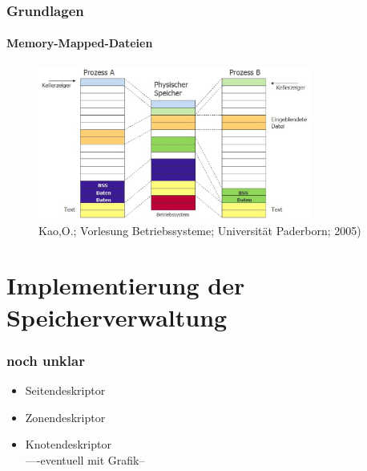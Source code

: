 \documentclass[ddcfooter,nosectionnum]{tudbeamer}
\begin{document}
\begin{frame} 
    \frametitle{Grundlagen}
    \framesubtitle{Memory-Mapped-Dateien}
    \begin{figure}[p]  
    \includegraphics[width=9cm]{segmente.eps}
    \caption{Kao,O.; Vorlesung Betriebssysteme; Universität Paderborn; 2005)} 
     \end{figure}
\end{frame}

\section{Implementierung der Speicherverwaltung}
%   
%

\begin{frame}
    \frametitle{noch unklar}
   
   \begin{itemize}
         		\item Seitendeskriptor
		\item Zonendeskriptor
		\item Knotendeskriptor\\
			
			----eventuell mit Grafik--
			
	
   	\end{itemize} 

   
       
\end{frame}
\end{document}
